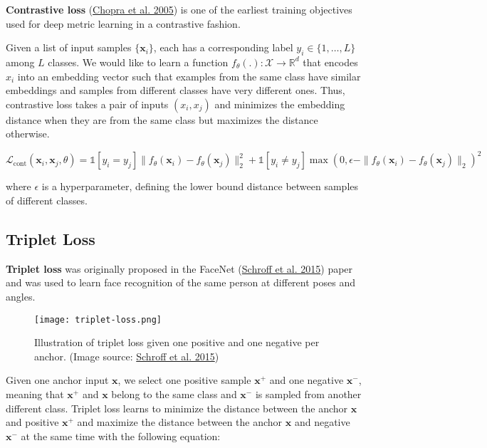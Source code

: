 \documentclass[12pt]{article}
\begin{document}
\textbf{Contrastive loss} (\href{http://yann.lecun.com/exdb/publis/pdf/chopra-05.pdf}{Chopra et al. 2005}) is one of the earliest training objectives used for deep metric learning in a contrastive fashion.

Given a list of input samples $\{ \mathbf{x}_i \}$, each has a corresponding label $y_i \in \{1, \dots, L\}$ among $L$ classes. We would like to learn a function $f_\theta(.): \mathcal{X}\to\mathbb{R}^d$ that encodes $x_i$ into an embedding vector such that examples from the same class have similar embeddings and samples from different classes have very different ones. Thus, contrastive loss takes a pair of inputs $(x_i, x_j)$ and minimizes the embedding distance when they are from the same class but maximizes the distance otherwise.

\[
\mathcal{L}_\text{cont}(\mathbf{x}_i, \mathbf{x}_j, \theta) = \mathbb{1}[y_i=y_j] \| f_\theta(\mathbf{x}_i) - f_\theta(\mathbf{x}_j) \|^2_2 + \mathbb{1}[y_i\neq y_j]\max(0, \epsilon - \|f_\theta(\mathbf{x}_i) - f_\theta(\mathbf{x}_j)\|_2)^2
\]

where $\epsilon$ is a hyperparameter, defining the lower bound distance between samples of different classes.

\subsection{Triplet Loss}

\textbf{Triplet loss} was originally proposed in the FaceNet (\href{https://arxiv.org/abs/1503.03832}{Schroff et al. 2015}) paper and was used to learn face recognition of the same person at different poses and angles.

\begin{figure}[H]
    \centering
    \texttt{[image: triplet-loss.png]}
    \caption{Illustration of triplet loss given one positive and one negative per anchor. (Image source: \href{https://arxiv.org/abs/1503.03832}{Schroff et al. 2015})}
\end{figure}

Given one anchor input $\mathbf{x}$, we select one positive sample $\mathbf{x}^+$ and one negative $\mathbf{x}^-$, meaning that $\mathbf{x}^+$ and $\mathbf{x}$ belong to the same class and $\mathbf{x}^-$ is sampled from another different class. Triplet loss learns to minimize the distance between the anchor $\mathbf{x}$ and positive $\mathbf{x}^+$ and maximize the distance between the anchor $\mathbf{x}$ and negative $\mathbf{x}^-$ at the same time with the following equation:
\end{document}
